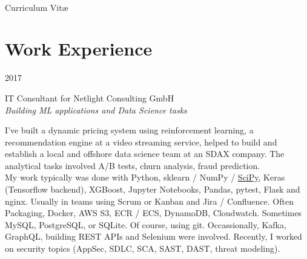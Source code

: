 \documentclass[a4paper,10pt]{article} %
\begin{document}
\color{text1} %


\par{\\ %
{\Huge \color{headings} Curriculum {Vit\ae}\\[15pt]\par}


\begin{minipage}[t]{0.5\textwidth}
\vspace{0pt} %


\section{Work Experience}


{\raggedleft\textsc{2017}\par}

{\raggedright\large IT Consultant for Netlight Consulting GmbH\\
\textit{Building ML applications and Data Science tasks}\\[5pt]}

\normalsize{I've built a dynamic pricing system using reinforcement learning, a recommendation engine at a video streaming service, helped to build and establish a local and offshore data science team at an SDAX company. The analytical tasks involved A/B tests, churn analysis, fraud prediction.\\
My work typically was done with Python, sklearn / NumPy / \href{https://arxiv.org/pdf/1907.10121.pdf}{SciPy}, Keras (Tensorflow backend), XGBoost,
Jupyter Notebooks, Pandas, pytest, Flask and nginx. Usually in teams using
Scrum or Kanban and Jira / Confluence. Often Packaging, Docker, AWS S3, ECR /
ECS, DynamoDB, Cloudwatch. Sometimes MySQL, PostgreSQL, or SQLite. Of course, using git.
Occassionally, Kafka, GraphQL, building REST APIs and Selenium were involved. Recently, I worked on security topics (AppSec, SDLC, SCA, SAST, DAST, threat modeling).}\\


\end{minipage}}
\end{document}
